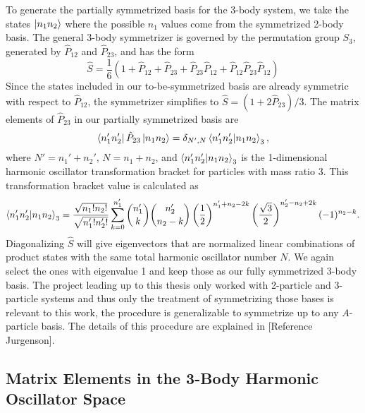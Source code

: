 To generate the partially symmetrized basis for the 3-body system, we take the states $\ket{n_1 n_2}$ where the possible $n_1$ values come from the symmetrized 2-body basis. The general 3-body symmetrizer is governed by the permutation group $S_3$, generated by $\hat{P}_{12}$ and $\hat{P}_{23}$, and has the form
\begin{equation}
\hat{S} = \frac{1}{6}(1 + \hat{P}_{12} + \hat{P}_{23} + \hat{P}_{23}\hat{P}_{12} + \hat{P}_{12}\hat{P}_{23}\hat{P}_{12})
\end{equation}
Since the states included in our to-be-symmetrized basis are already symmetric with respect to $\hat{P}_{12}$, the symmetrizer simplifies to $\hat{S} = (1 + 2\hat{P}_{23})/3$. The matrix elements of $\hat{P}_{23}$ in our partially symmetrized basis are
\begin{equation}
\bra{n_1' n_2'}\hat{P}_{23}\ket{n_1 n_2} = \delta_{N',N} \bra{n_1' n_2'}\ket{n_1 n_2}_3,
\end{equation}
where $N'=n_1' +n_2'$, $N=n_1 + n_2$, and $\bra{n_1' n_2'}\ket{n_1 n_2}_3$ is the 1-dimensional harmonic oscillator transformation bracket for particles with mass ratio 3. This transformation bracket value is calculated as
\begin{equation}
\bra{n_1' n_2'}\ket{n_1 n_2}_3 = \frac{\sqrt{n_1!n_2!}}{\sqrt{n_1'!n_2'!}}\sum_{k=0}^{n_1'}\binom{n_1'}{k}\binom{n_2'}{n_2 - k}\left(\frac{1}{2}\right)^{n_1' + n_2 - 2k}\left(\frac{\sqrt{3}}{2}\right)^{n_2' - n_2 + 2k} (-1)^{n_2-k}.
\end{equation}
Diagonalizing $\hat{S}$ will give eigenvectors that are normalized linear combinations of product states with the same total harmonic oscillator number $N$. We again select the ones with eigenvalue 1 and keep those as our fully symmetrized 3-body basis. The project leading up to this thesis only worked with 2-particle and 3-particle systems and thus only the treatment of symmetrizing those bases is relevant to this work, the procedure is generalizable to symmetrize up to any $A$-particle basis. The details of this procedure are explained in [Reference Jurgenson].

\subsection{Matrix Elements in the 3-Body Harmonic Oscillator Space}

